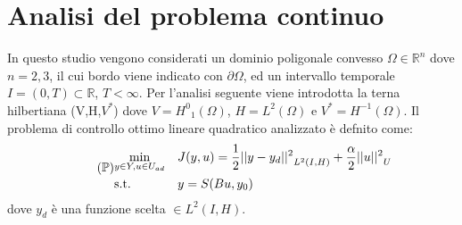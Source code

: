 \chapter{Analisi del problema continuo}
\label{chap:Continuos}

In questo studio vengono considerati un dominio poligonale convesso $\Omega \in \mathbb{R}^n$ dove $n=2,3$, il cui bordo viene indicato con $\partial\Omega$, ed un intervallo temporale $I = (0,T) \subset \mathbb{R}$, $T < \infty$. 
Per l'analisi seguente viene introdotta la terna hilbertiana (V,H,$V^*$) dove $V={H^0}_1(\Omega)$, $H=L^2(\Omega)$ e $V^*=H^{-1}(\Omega)$.
Il problema di controllo ottimo lineare quadratico analizzato è defnito come:
{\renewcommand\arraystretch{2}
\begin{equation}
\tag{$\mathbb{P}$}
\begin{aligned}
& \underset{y \in Y, u \in U_{ad}}{\text{min}}
& & J(y,u) = \frac{1}{2}{||y-y_d||^{2}}_{L^2(I,H)} + \frac{\alpha}{2}{||u||^{2}}_U \\
& \text{s.t.} & & y = S(Bu,y_0) \\
\label{eq:200}
\end{aligned}
\end{equation}
} %
dove $y_d$ è una funzione scelta $\in L^2(I,H)$.

